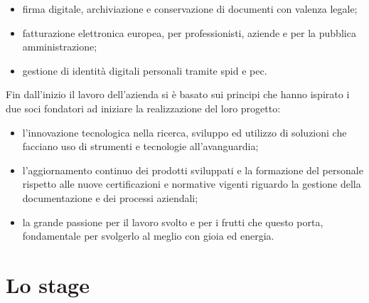 \begin{itemize}
	\item firma digitale, archiviazione e conservazione di documenti con valenza legale;
	\item fatturazione elettronica europea, per professionisti, aziende e per la pubblica amministrazione;
	\item gestione di identità digitali personali tramite \gls{spid}\glsfirstoccur{} e \gls{pec}\glsfirstoccur.
\end{itemize}

Fin dall'inizio il lavoro dell'azienda si è basato sui principi che hanno ispirato i due soci fondatori ad iniziare la realizzazione del loro progetto:

\begin{itemize}
	\item l'innovazione tecnologica nella ricerca, sviluppo ed utilizzo di soluzioni che facciano uso di strumenti e tecnologie all'avanguardia;
	\item l'aggiornamento continuo dei prodotti sviluppati e la formazione del personale rispetto alle nuove certificazioni e normative vigenti riguardo la gestione della documentazione e dei processi aziendali;
	\item la grande passione per il lavoro svolto e per i frutti che questo porta, fondamentale per svolgerlo al meglio con gioia ed energia.
\end{itemize}

\section{Lo stage}

